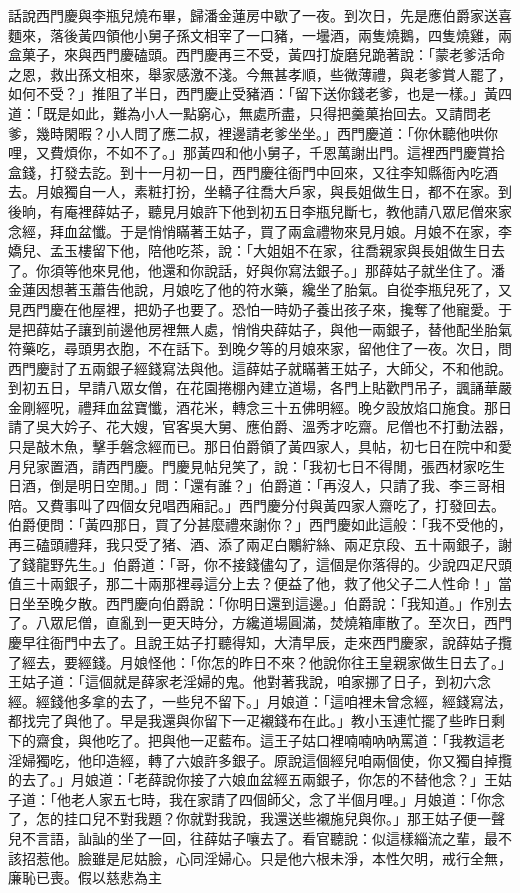 \begin{showcontents}{}
話說西門慶與李瓶兒燒布畢，歸潘金蓮房中歇了一夜。到次日，先是應伯爵家送喜麵來，落後黃四領他小舅子孫文相宰了一口豬，一壜酒，兩隻燒鵝，四隻燒雞，兩盒菓子，來與西門慶磕頭。西門慶再三不受，黃四打旋磨兒跪著說：「蒙老爹活命之恩，救出孫文相來，舉家感激不淺。今無甚孝順，些微薄禮，與老爹賞人罷了，如何不受？」推阻了半日，西門慶止受豬酒：「留下送你錢老爹，也是一樣。」黃四道：「既是如此，難為小人一點窮心，無處所盡，只得把羹菓抬回去。又請問老爹，幾時閑暇？小人問了應二叔，裡邊請老爹坐坐。」西門慶道：「你休聽他哄你哩，又費煩你，不如不了。」那黃四和他小舅子，千恩萬謝出門。這裡西門慶賞拾盒錢，打發去訖。到十一月初一日，西門慶往衙門中回來，又往李知縣衙內吃酒去。月娘獨自一人，素粧打扮，坐轎子往喬大戶家，與長姐做生日，都不在家。到後晌，有庵裡薛姑子，聽見月娘許下他到初五日李瓶兒斷七，教他請八眾尼僧來家念經，拜血盆懺。于是悄悄瞞著王姑子，買了兩盒禮物來見月娘。月娘不在家，李嬌兒、孟玉樓留下他，陪他吃茶，說：「大姐姐不在家，往喬親家與長姐做生日去了。你須等他來見他，他還和你說話，好與你寫法銀子。」那薛姑子就坐住了。潘金蓮因想著玉蕭告他說，月娘吃了他的符水藥，纔坐了胎氣。自從李瓶兒死了，又見西門慶在他屋裡，把奶子也要了。恐怕一時奶子養出孩子來，攙奪了他寵愛。于是把薛姑子讓到前邊他房裡無人處，悄悄央薛姑子，與他一兩銀子，替他配坐胎氣符藥吃，尋頭男衣胞，不在話下。到晚夕等的月娘來家，留他住了一夜。次日，問西門慶討了五兩銀子經錢寫法與他。這薛姑子就瞞著王姑子，大師父，不和他說。到初五日，早請八眾女僧，在花園捲棚內建立道場，各門上貼歡門吊子，諷誦華嚴金剛經呪，禮拜血盆寶懺，酒花米，轉念三十五佛明經。晚夕設放焰口施食。那日請了吳大妗子、花大嫂，官客吳大舅、應伯爵、溫秀才吃齋。尼僧也不打動法器，只是敲木魚，擊手磐念經而已。那日伯爵領了黃四家人，具帖，初七日在院中和愛月兒家置酒，請西門慶。門慶見帖兒笑了，說：「我初七日不得閒，張西材家吃生日酒，倒是明日空閒。」問：「還有誰？」伯爵道：「再沒人，只請了我、李三哥相陪。又費事叫了四個女兒唱西廂記。」西門慶分付與黃四家人齋吃了，打發回去。伯爵便問：「黃四那日，買了分甚麼禮來謝你？」西門慶如此這般：「我不受他的，再三磕頭禮拜，我只受了猪、酒、添了兩疋白鷴紵絲、兩疋京段、五十兩銀子，謝了錢龍野先生。」伯爵道：「哥，你不接錢儘勾了，這個是你落得的。少說四疋尺頭值三十兩銀子，那二十兩那裡尋這分上去？便益了他，救了他父子二人性命！」當日坐至晚夕散。西門慶向伯爵說：「你明日還到這邊。」伯爵說：「我知道。」作別去了。八眾尼僧，直亂到一更天時分，方纔道場圓滿，焚燒箱庫散了。至次日，西門慶早往衙門中去了。且說王姑子打聽得知，大清早辰，走來西門慶家，說薛姑子攬了經去，要經錢。月娘怪他：「你怎的昨日不來？他說你往王皇親家做生日去了。」王姑子道：「這個就是薛家老淫婦的鬼。他對著我說，咱家挪了日子，到初六念經。經錢他多拿的去了，一些兒不留下。」月娘道：「這咱裡未曾念經，經錢寫法，都找完了與他了。早是我還與你留下一疋襯錢布在此。」教小玉連忙擺了些昨日剩下的齋食，與他吃了。把與他一疋藍布。這王子姑口裡喃喃吶吶罵道：「我教這老淫婦獨吃，他印造經，轉了六娘許多銀子。原說這個經兒咱兩個使，你又獨自掉攬的去了。」月娘道：「老薛說你接了六娘血盆經五兩銀子，你怎的不替他念？」王姑子道：「他老人家五七時，我在家請了四個師父，念了半個月哩。」月娘道：「你念了，怎的挂口兒不對我題？你就對我說，我還送些襯施兒與你。」那王姑子便一聲兒不言語，訕訕的坐了一回，往薛姑子嚷去了。看官聽說：似這樣緇流之輩，最不該招惹他。臉雖是尼姑臉，心同淫婦心。只是他六根未淨，本性欠明，戒行全無，廉恥已喪。假以慈悲為主
\end{showcontents}
